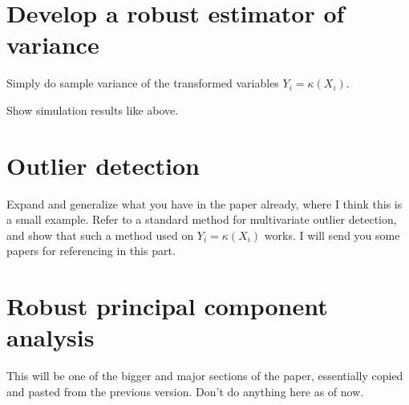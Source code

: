\documentclass[12pt,letterpaper]{article}
\theoremstyle{definition} \newtheorem{Definition}[Theorem]{Definition}
\begin{document}
%
%
%
%
%
%
%
%
%
%

\section{Develop a robust estimator of variance}
Simply do sample variance of the transformed variables $Y_{i} = \kappa (X_{i})$.

Show simulation results like above.

\section{Outlier detection}

Expand and generalize what you have in the paper already, where I think this is a small 
example. Refer to a standard method for multivariate outlier detection, and show that 
such a method used on $Y_{i} = \kappa (X_{i})$ works. I will send you some papers for 
referencing in this part.

\section{Robust principal component analysis}

This will be one of the bigger and 
 major sections of the paper, essentially copied and pasted
 from the previous version. Don't do anything here as of now.
\end{document}
